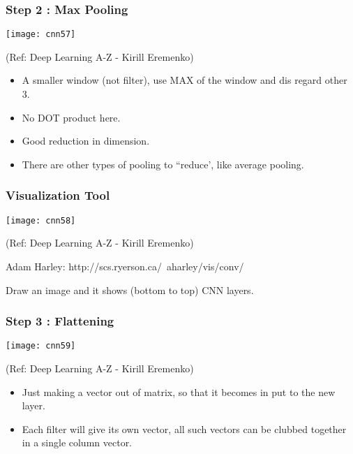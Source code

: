 \begin{frame}[fragile] \frametitle{Step 2 : Max Pooling}

\begin{center}
\texttt{[image: cnn57]}

\tiny{(Ref: Deep Learning A-Z - Kirill Eremenko)}
\end{center}

\begin{itemize}
\item A smaller window (not filter), use MAX of the window and dis regard other 3. 
\item No DOT product here.
\item Good reduction in dimension.
\item There are other types of pooling to ``reduce', like average pooling.
\end{itemize}

\end{frame}

\begin{frame}[fragile] \frametitle{Visualization Tool}


\begin{center}
\texttt{[image: cnn58]}

\tiny{(Ref: Deep Learning A-Z - Kirill Eremenko)}
\end{center}

Adam Harley: http://scs.ryerson.ca/~aharley/vis/conv/

Draw an image and it shows (bottom to top) CNN layers.

\end{frame}

\begin{frame}[fragile] \frametitle{Step 3 : Flattening}

\begin{center}
\texttt{[image: cnn59]}

\tiny{(Ref: Deep Learning A-Z - Kirill Eremenko)}
\end{center}

\begin{itemize}
\item Just making a vector out of matrix, so that it becomes in put to the new layer.
\item Each filter will give its own vector, all such vectors can be clubbed together in a single column vector.
\end{itemize}

\end{frame}

